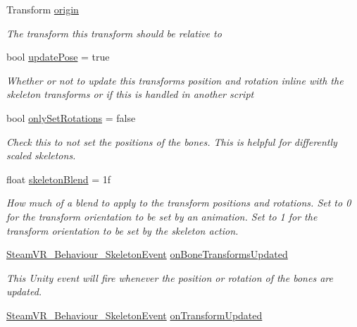 \begin{DoxyCompactItemize}
Transform \mbox{\hyperlink{class_valve_1_1_v_r_1_1_steam_v_r___behaviour___skeleton_a9ad8af297aed416cd28d8789ed31ff4f}{origin}}
\begin{DoxyCompactList}\small\item\em The transform this transform should be relative to \end{DoxyCompactList}\item 
bool \mbox{\hyperlink{class_valve_1_1_v_r_1_1_steam_v_r___behaviour___skeleton_af19c499f14c537f57eca2d4186ec4f5e}{update\+Pose}} = true
\begin{DoxyCompactList}\small\item\em Whether or not to update this transform\textquotesingle{}s position and rotation inline with the skeleton transforms or if this is handled in another script \end{DoxyCompactList}\item 
bool \mbox{\hyperlink{class_valve_1_1_v_r_1_1_steam_v_r___behaviour___skeleton_a10038fecd6aac182080f18b339226583}{only\+Set\+Rotations}} = false
\begin{DoxyCompactList}\small\item\em Check this to not set the positions of the bones. This is helpful for differently scaled skeletons. \end{DoxyCompactList}\item 
float \mbox{\hyperlink{class_valve_1_1_v_r_1_1_steam_v_r___behaviour___skeleton_afd266920dc0534d09bad29e5e5245366}{skeleton\+Blend}} = 1f
\begin{DoxyCompactList}\small\item\em How much of a blend to apply to the transform positions and rotations. Set to 0 for the transform orientation to be set by an animation. Set to 1 for the transform orientation to be set by the skeleton action. \end{DoxyCompactList}\item 
\mbox{\hyperlink{class_valve_1_1_v_r_1_1_steam_v_r___behaviour___skeleton_event}{Steam\+V\+R\+\_\+\+Behaviour\+\_\+\+Skeleton\+Event}} \mbox{\hyperlink{class_valve_1_1_v_r_1_1_steam_v_r___behaviour___skeleton_a32ca64f78a462086d338e9d3bc8d6464}{on\+Bone\+Transforms\+Updated}}
\begin{DoxyCompactList}\small\item\em This Unity event will fire whenever the position or rotation of the bones are updated. \end{DoxyCompactList}\item 
\mbox{\hyperlink{class_valve_1_1_v_r_1_1_steam_v_r___behaviour___skeleton_event}{Steam\+V\+R\+\_\+\+Behaviour\+\_\+\+Skeleton\+Event}} \mbox{\hyperlink{class_valve_1_1_v_r_1_1_steam_v_r___behaviour___skeleton_a440fdb99dd19fb6af79382f1f5a8b252}{on\+Transform\+Updated}}

\end{DoxyCompactItemize}
